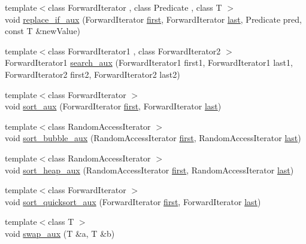 \begin{DoxyCompactItemize}
\item 
{\footnotesize template$<$class Forward\+Iterator , class Predicate , class T $>$ }\\void \hyperlink{namespaceprism_ad23d44d30470aed0ee16e931514bd727}{replace\+\_\+if\+\_\+aux} (Forward\+Iterator \hyperlink{namespaceprism_ae3fb7a1926a9e8e59300cd5e370470da}{first}, Forward\+Iterator \hyperlink{namespaceprism_abe4956c4e865f55ca126b7fb973b5078}{last}, Predicate pred, const T \&new\+Value)
\item 
{\footnotesize template$<$class Forward\+Iterator1 , class Forward\+Iterator2 $>$ }\\Forward\+Iterator1 \hyperlink{namespaceprism_ab6f8ed8b450ff281e02218e10d5643a7}{search\+\_\+aux} (Forward\+Iterator1 first1, Forward\+Iterator1 last1, Forward\+Iterator2 first2, Forward\+Iterator2 last2)
\item 
{\footnotesize template$<$class Forward\+Iterator $>$ }\\void \hyperlink{namespaceprism_a9e7b2f97895db323cbefbc4af311ccb9}{sort\+\_\+aux} (Forward\+Iterator \hyperlink{namespaceprism_ae3fb7a1926a9e8e59300cd5e370470da}{first}, Forward\+Iterator \hyperlink{namespaceprism_abe4956c4e865f55ca126b7fb973b5078}{last})
\item 
{\footnotesize template$<$class Random\+Access\+Iterator $>$ }\\void \hyperlink{namespaceprism_af3a66e1051c4c7874f305ad2a5f0b37e}{sort\+\_\+bubble\+\_\+aux} (Random\+Access\+Iterator \hyperlink{namespaceprism_ae3fb7a1926a9e8e59300cd5e370470da}{first}, Random\+Access\+Iterator \hyperlink{namespaceprism_abe4956c4e865f55ca126b7fb973b5078}{last})
\item 
{\footnotesize template$<$class Random\+Access\+Iterator $>$ }\\void \hyperlink{namespaceprism_ab289bdf7cde130b0aeea21a9711770f4}{sort\+\_\+heap\+\_\+aux} (Random\+Access\+Iterator \hyperlink{namespaceprism_ae3fb7a1926a9e8e59300cd5e370470da}{first}, Random\+Access\+Iterator \hyperlink{namespaceprism_abe4956c4e865f55ca126b7fb973b5078}{last})
\item 
{\footnotesize template$<$class Forward\+Iterator $>$ }\\void \hyperlink{namespaceprism_a46e0e235fa71938e5ebf29387b917057}{sort\+\_\+quicksort\+\_\+aux} (Forward\+Iterator \hyperlink{namespaceprism_ae3fb7a1926a9e8e59300cd5e370470da}{first}, Forward\+Iterator \hyperlink{namespaceprism_abe4956c4e865f55ca126b7fb973b5078}{last})
\item 
{\footnotesize template$<$class T $>$ }\\void \hyperlink{namespaceprism_a6d3a7129cc6ab5d9a80301436e4d2e48}{swap\+\_\+aux} (T \&a, T \&b)

\end{DoxyCompactItemize}
